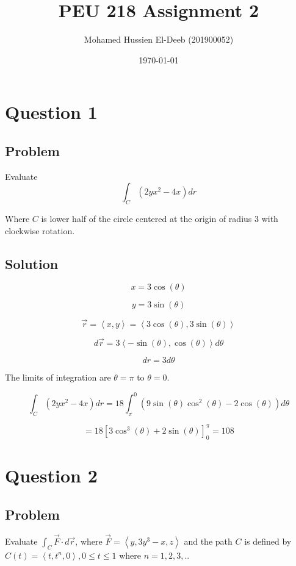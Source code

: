 \documentclass[12pt]{article}
\title{PEU 218 Assignment 2}
\author{Mohamed Hussien El-Deeb (201900052)}
\date{\today}
\begin{document}
\maketitle
\tableofcontents
\hypersetup{linkcolor=RoyalBlue4}

\newpage
\section{Question 1}

\subsection{Problem}

Evaluate
\[
    \int_C \left(2y x^2 - 4x\right) d r
\]

Where \(C\) is lower half of the circle centered at the origin of radius 3 with clockwise
rotation.

\subsection{Solution}

\[x = 3 \cos(\theta)\]

\[y = 3 \sin(\theta)\]

\[
    \vec{r} = \left\langle x, y\right\rangle =
    \left\langle 3 \cos(\theta), 3 \sin(\theta)\right\rangle
\]

\[
    d \vec{r} = 3 \left\langle -\sin(\theta), \cos(\theta)\right\rangle d\theta
\]

\[
    d r = 3 d \theta
\]



The limits of integration are \(\theta = \pi \) to \(\theta = 0\).

\[
    \int_C \left(2y x^2 - 4x\right) d r
    = 18 \int_{\pi}^{0} \left(9 \sin(\theta) \cos^2(\theta) - 2 \cos(\theta)\right) d \theta
\]

\[
    = 18 \left[3 \cos^3(\theta) + 2 \sin(\theta)\right]_{0}^{\pi}
    = 108
\]

\newpage
\section{Question 2}

\subsection{Problem}

Evaluate \(\int_C \vec{F} \cdot d \vec{r}\), where
\(\vec{F}=\left\langle y, 3y^3 - x, z\right\rangle \) and the path \(C\) is defined by
\(C(t) = \left\langle t, t^n, 0\right\rangle, 0 \leq t \leq 1\) where \(n = 1, 2, 3, .. \)
\end{document}
